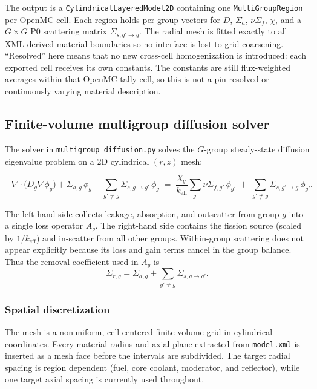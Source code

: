 \documentclass[11pt]{article}
\begin{document}
The output is a \texttt{CylindricalLayeredModel2D} containing one
\texttt{MultiGroupRegion} per OpenMC cell.  Each region holds per-group
vectors for $D$, $\Sigma_a$, $\nu\Sigma_f$, $\chi$, and a $G\times G$ P0
scattering matrix $\Sigma_{s,g'\to g}$.  The radial mesh is fitted exactly
to all XML-derived material boundaries so no interface is lost to grid
coarsening.  ``Resolved'' here means that no new cross-cell homogenization is
introduced: each exported cell receives its own constants.  The constants are
still flux-weighted averages within that OpenMC tally cell, so this is not a
pin-resolved or continuously varying material description.

\subsection{Finite-volume multigroup diffusion solver}

The solver in \texttt{multigroup\_diffusion.py} solves the $G$-group
steady-state diffusion eigenvalue problem on a 2D cylindrical $(r,z)$ mesh:

\[
-\nabla \cdot \bigl(D_g \nabla \phi_g\bigr)
+ \Sigma_{a,g}\,\phi_g
+ \sum_{g'\neq g} \Sigma_{s,g\to g'}\,\phi_g
\;=\;
\frac{\chi_g}{k_{\mathrm{eff}}}
\sum_{g'} \nu\Sigma_{f,g'}\,\phi_{g'}
\;+\;
\sum_{g'\neq g} \Sigma_{s,g'\to g}\,\phi_{g'} .
\]

The left-hand side collects leakage, absorption, and outscatter from group
$g$ into a single loss operator $A_g$.  The right-hand side contains the
fission source (scaled by $1/k_{\mathrm{eff}}$) and in-scatter from all other
groups.  Within-group scattering does not appear explicitly because its loss
and gain terms cancel in the group balance.  Thus the removal coefficient used
in $A_g$ is
\[
\Sigma_{r,g} =
\Sigma_{a,g} + \sum_{g'\ne g}\Sigma_{s,g\to g'} .
\]

\subsubsection{Spatial discretization}

The mesh is a nonuniform, cell-centered finite-volume grid in cylindrical
coordinates.  Every material radius and axial plane extracted from
\texttt{model.xml} is inserted as a mesh face before the intervals are
subdivided.  The target radial spacing is region dependent (fuel, core
coolant, moderator, and reflector), while one target axial spacing is
currently used throughout.
\end{document}
